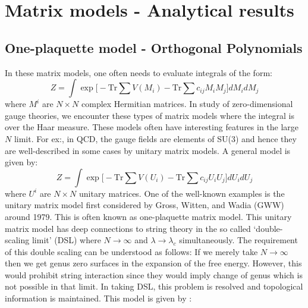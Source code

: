 \documentclass[11pt]{article}
\begin{document}
\section{\label{sec:MMAres}Matrix models - Analytical results} 
\subsection{One-plaquette model - Orthogonal Polynomials} 
In these matrix models, one often needs to evaluate integrals of the form:
\begin{equation}
Z = \int \exp\Bigg[  -\mathrm{Tr} \sum V(M_{i})  -  \mathrm{Tr} \sum c_{ij}M_{i}M_{j}   \Bigg] dM_{i} dM_{j}
\end{equation}
where $M^{i}$ are $N \times N$ complex Hermitian matrices. 
In study of zero-dimensional gauge theories, we encounter these types of matrix models where the integral is over the Haar measure. These models often have interesting features in the large $N$ limit.
For ex:, in QCD, the gauge fields are elements of SU(3) and hence they are well-described in some cases by unitary matrix models. A general model is given by:
\begin{equation}
	Z = \int \exp\Bigg[  -\mbox{Tr} \sum V(U_{i})  -  \mbox{Tr} \sum c_{ij}U_{i}U_{j}   \Bigg] dU_{i} dU_{j}
\end{equation}
where $U^{i}$ are $N \times N$ unitary matrices. 
One of the well-known examples is the unitary matrix model first considered by Gross, Witten, and Wadia (GWW) around 1979. This is often known as one-plaquette matrix model. This unitary matrix model has deep connections to string theory in the so called `double-scaling limit' (DSL) where $N \to \infty$ and $\lambda \to \lambda_{c}$ simultaneously. The requirement of this double scaling can be understood as follows: If we merely take $N \to \infty$ then we get genus zero surfaces in the expansion of the free energy. However, this would prohibit string interaction since they would imply change of genus which is not possible in that limit. In taking DSL, this problem is resolved and topological information is maintained. This model is given by : 
\end{document}
